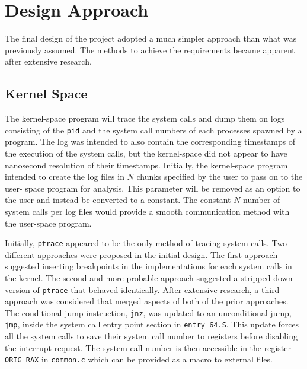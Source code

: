 \documentclass[paper=usletter, fontsize=12pt]{article}
\begin{document}

    

    \section{Design Approach} The final design of the project adopted a much
    simpler approach than what was previously assumed. The methods to achieve
    the requirements became apparent after extensive research.

    \subsection{Kernel Space} The kernel-space program will trace the system
    calls and dump them on logs consisting of the \texttt{pid} and the system
    call numbers of each processes spawned by a program. The log was intended
    to also contain the corresponding timestamps of the execution of the system
    calls, but the kernel-space did not appear to have nanosecond resolution of
    their timestamps. Initially, the kernel-space program intended to create
    the log files in $N$ chunks specified by the user to pass on to the user-
    space program for analysis. This parameter will be removed as an option to
    the user and instead be converted to a constant. The constant $N$ number of
    system calls per log files would provide a smooth communication method with
    the user-space program.

    Initially, \texttt{ptrace} appeared to be the only method of tracing system
    calls. Two different approaches were proposed in the initial design. The
    first approach suggested inserting breakpoints in the implementations for
    each system calls in the kernel. The second and more probable approach
    suggested a stripped down version of \texttt{ptrace} that behaved
    identically. After extensive research, a third approach was considered that
    merged aspects of both of the prior approaches. The conditional jump
    instruction, \texttt{jnz}, was updated to an unconditional jump,
    \texttt{jmp}, inside the system call entry point section in
    \texttt{entry\_64.S}. This update forces all the system calls to save their
    system call number to registers before disabling the interrupt request. The
    system call number is then accessible in the register \texttt{ORIG\_RAX} in
    \texttt{common.c} which can be provided as a macro to external files.
\end{document}
